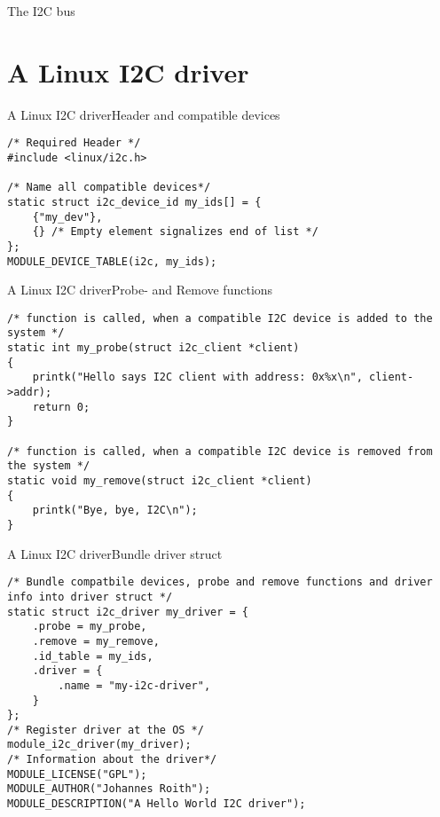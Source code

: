 \documentclass[aspectratio=169]{beamer}
\begin{document}
\begin{frame}{The I2C bus}
	\centering
\end{frame}

\section{A Linux I2C driver}
\begin{frame}[fragile]{A Linux I2C driver}{Header and compatible devices}
	\begin{lstlisting}
/* Required Header */
#include <linux/i2c.h>

/* Name all compatible devices*/
static struct i2c_device_id my_ids[] = {
	{"my_dev"},
	{} /* Empty element signalizes end of list */
};
MODULE_DEVICE_TABLE(i2c, my_ids);
	\end{lstlisting}
\end{frame}


\begin{frame}[fragile]{A Linux I2C driver}{Probe- and Remove functions}
	\begin{lstlisting}
/* function is called, when a compatible I2C device is added to the system */
static int my_probe(struct i2c_client *client)
{
	printk("Hello says I2C client with address: 0x%x\n", client->addr);
	return 0;
}

/* function is called, when a compatible I2C device is removed from the system */
static void my_remove(struct i2c_client *client)
{
	printk("Bye, bye, I2C\n");
}
	\end{lstlisting}
\end{frame}

\begin{frame}[fragile]{A Linux I2C driver}{Bundle driver struct}
	\begin{lstlisting}
/* Bundle compatbile devices, probe and remove functions and driver info into driver struct */
static struct i2c_driver my_driver = {
	.probe = my_probe,
	.remove = my_remove,
	.id_table = my_ids,
	.driver = {
		.name = "my-i2c-driver",
	}
};
/* Register driver at the OS */
module_i2c_driver(my_driver);
/* Information about the driver*/
MODULE_LICENSE("GPL");
MODULE_AUTHOR("Johannes Roith");
MODULE_DESCRIPTION("A Hello World I2C driver");
	\end{lstlisting}
\end{frame}
\end{document}

